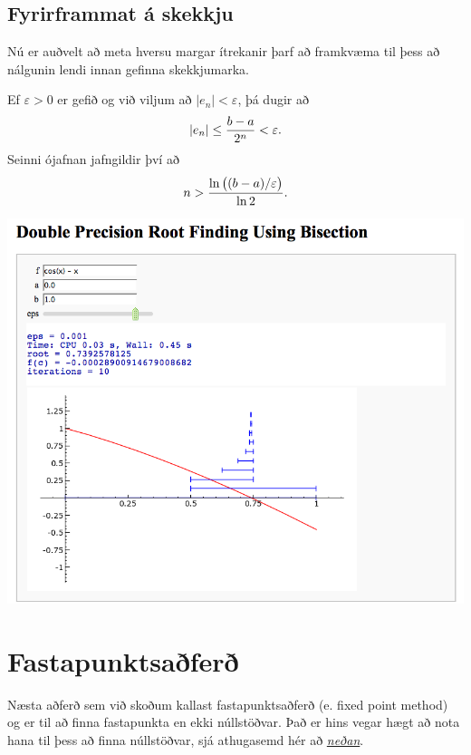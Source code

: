 \documentclass[letterpaper,10pt,icelandic]{sphinxmanual}
\begin{document}
\subsection{Fyrirframmat á skekkju}
\label{kafli02:fyrirframmat-a-skekkju}
Nú er auðvelt að meta hversu margar ítrekanir þarf að framkvæma til þess
að nálgunin lendi innan gefinna skekkjumarka.

Ef \(\varepsilon>0\) er gefið og við viljum að
\(|e_n|< \varepsilon\), þá dugir að
\begin{gather}
\begin{split}|e_n|\leq \dfrac{b-a}{2^{n}} <\varepsilon.\end{split}\notag
\end{gather}
Seinni ójafnan jafngildir því að
\begin{gather}
\begin{split}n>\dfrac{\ln\big((b-a)/\varepsilon\big)}{\ln 2}.\end{split}\notag
\end{gather}

\begin{center}
\includegraphics[width=8 cm,keepaspectratio=true]{bisection.png}

\end{center}

\section{Fastapunktsaðferð}
\label{kafli02:fastapunktsafer}\label{kafli02:index-2}
Næsta aðferð sem við skoðum kallast fastapunktsaðferð (e. fixed point method) og
er til að finna fastapunkta en ekki núllstöðvar. Það er hins vegar hægt að
nota hana til þess að finna núllstöðvar, sjá athugasemd hér að {\hyperref[kafli02:fastapunktar-nullstodvar]{\emph{neðan}}}.
\end{document}
